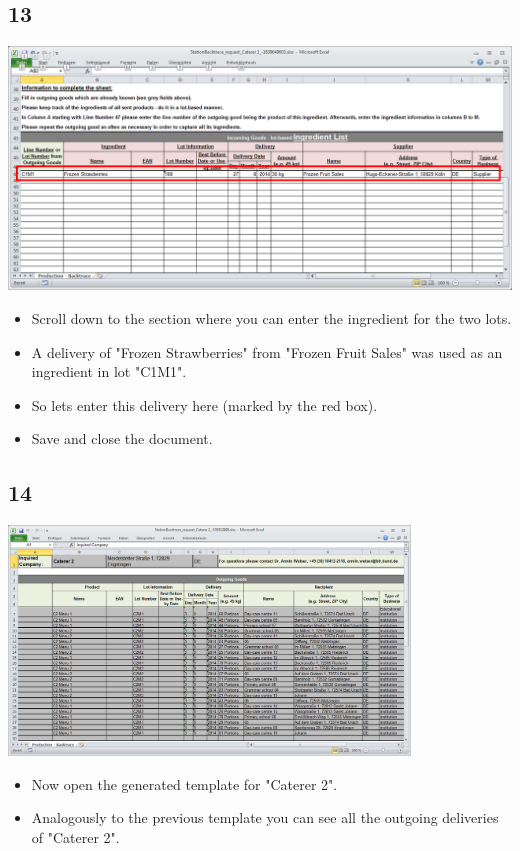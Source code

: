 \documentclass{beamer}
\begin{document}
\subsection{13}
\begin{frame}
	\begin{center}
  		\includegraphics[height=0.5\textwidth]{13.png}
	\end{center}
	\begin{itemize}
		\item Scroll down to the section where you can enter the ingredient for the two lots.
		\item A delivery of "Frozen Strawberries" from "Frozen Fruit Sales" was used as an ingredient in lot "C1M1".
		\item So lets enter this delivery here (marked by the red box).
		\item Save and close the document.
	\end{itemize}
\end{frame}

\subsection{14}
\begin{frame}
	\begin{center}
  		\includegraphics[width=0.8\textwidth]{14.png}
	\end{center}
	\begin{itemize}
		\item Now open the generated template for "Caterer 2".
		\item Analogously to the previous template you can see all the outgoing deliveries of "Caterer 2".
	\end{itemize}
\end{frame}
\end{document}
